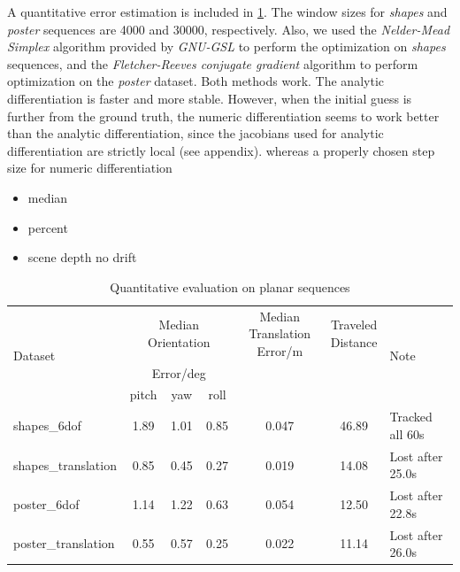A quantitative error estimation is included in \cref{tab:err_est}. The
window sizes for \textit{shapes} and \textit{poster} sequences are
4000 and 30000, respectively. Also, we used the \textit{Nelder-Mead Simplex}
algorithm provided by \textit{GNU-GSL}\citep{gough2009gnu}
to perform the optimization on \textit{shapes} sequences, and the
\textit{Fletcher-Reeves conjugate gradient}\citep{fletcher2013practical} algorithm to perform
optimization on the \textit{poster} dataset. Both methods work. The
analytic differentiation is faster and more stable. However, when the
initial guess is further from the ground truth, the numeric
differentiation seems to work better than the analytic
differentiation, since the jacobians used for analytic differentiation
are strictly local (see appendix). whereas a properly chosen step size
for numeric differentiation
\begin{itemize}
\item median\\
\item percent\\
\item scene depth no drift\\
\end{itemize}

\begin{table}[h]
  \label{tab:err_est}
  \begin{center}
    \begin{tabular}{lcccccl}
      \hline
      \multirow{3}{*}{Dataset}&\multicolumn{3}{c}{Median Orientation}&\multirowcell{3}{Median Translation \\ Error/m}&\multirowcell{3}{Traveled\\Distance}&\multirow{3}{*}{Note}\\
                              &\multicolumn{3}{c}{Error/deg}& &\\
      \cline{2-4}
                              & pitch&  yaw & roll &       &       &                  \\
      \hline
      shapes\_6dof        & 1.89 & 1.01 & 0.85 & 0.047 & 46.89 & Tracked all 60s  \\
      shapes\_translation & 0.85 & 0.45 & 0.27 & 0.019 & 14.08 & Lost after 25.0s \\
      poster\_6dof        & 1.14 & 1.22 & 0.63 & 0.054 & 12.50 & Lost after 22.8s \\
      poster\_translation & 0.55 & 0.57 & 0.25 & 0.022 & 11.14 & Lost after 26.0s \\
      \hline
    \end{tabular}
  \end{center}
  \caption{Quantitative evaluation on planar sequences}
\end{table}


